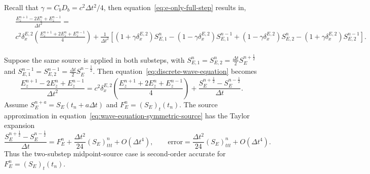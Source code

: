 \documentclass{article}
\numberwithin{figure}{section}
\begin{document}
Recall that $\gamma=C_bD_b=c^2\Delta t^2/4$, then equation~\eqref{eq:e-only-full-step} results in,
\begin{align}
    \begin{split}
         & \frac{E_z^{n+1}-2E_z^n+E_z^{n-1}}{\Delta t^2}=                                                                                                                                                                                                                                                                                     \\
         & c^2\delta_x^{E,2}\left(\frac{E_z^{n+1}+2E_z^n+E_z^{n-1}}{4}\right)+\frac{1}{\Delta t^2}\left[\left(1+\gamma\delta_x^{E,2}\right)S_{E,1}^n-\left(1-\gamma\delta_x^{E,2}\right)S_{E,1}^{n-1}+\left(1-\gamma\delta_x^{E,2}\right)S_{E,2}^n-\left(1+\gamma\delta_x^{E,2}\right)S_{E,2}^{n-1}\right]. \label{eq:discrete-wave-equation}
    \end{split}
\end{align}

Suppose the same source is applied in both substeps, with $S_{E,1}^n=S_{E,2}^n=\frac{\Delta t}{2}S_E^{n+\frac{1}{2}}$ and $S_{E,1}^{n-1}=S_{E,2}^{n-1}=\frac{\Delta t}{2}S_E^{n-\frac{1}{2}}$. Then equation~\eqref{eq:discrete-wave-equation} becomes
\begin{equation}
    \frac{E_z^{n+1}-2E_z^n+E_z^{n-1}}{\Delta t^2}=c^2\delta_x^{E,2}\left(\frac{E_z^{n+1}+2E_z^n+E_z^{n-1}}{4}\right)+\frac{S_E^{n+\frac{1}{2}}-S_E^{n-\frac{1}{2}}}{\Delta t}. \label{eq:wave-equation-symmetric-source}
\end{equation}
Assume $S_E^{n+a}=S_E(t_n+a\Delta t)$ and $F_E^n=(S_E)_t(t_n)$. The source approximation in equation~\eqref{eq:wave-equation-symmetric-source} has the Taylor expansion
\begin{equation}
    \frac{S_E^{n+\frac{1}{2}}-S_E^{n-\frac{1}{2}}}{\Delta t}=F_E^n+\frac{\Delta t^2}{24}(S_E)_{ttt}^n+O(\Delta t^4), \qquad \mathrm{error}=\frac{\Delta t^2}{24}(S_E)_{ttt}^n+O(\Delta t^4). \label{eq:symmetric-source-error}
\end{equation}
Thus the two-substep midpoint-source case is second-order accurate for $F_E^n=(S_E)_t(t_n)$.
\end{document}
